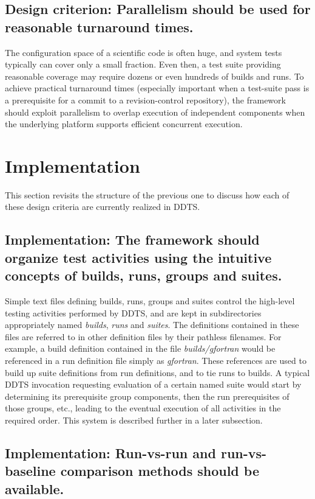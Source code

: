 \documentclass[conference]{IEEEtran}
\begin{document}
\subsection{Design criterion: Parallelism should be used for reasonable turnaround times.}

The configuration space of a scientific code is often huge, and system tests typically can cover only a small fraction. Even then, a test suite providing reasonable coverage may require dozens or even hundreds of builds and runs. To achieve practical turnaround times (especially important when a test-suite pass is a prerequisite for a commit to a revision-control repository), the framework should exploit parallelism to overlap execution of independent components when the underlying platform supports efficient concurrent execution.

\section{Implementation}

This section revisits the structure of the previous one to discuss how each of these design criteria are currently realized in DDTS.

\subsection{Implementation: The framework should organize test activities using the intuitive concepts of builds, runs, groups and suites.}

Simple text files defining builds, runs, groups and suites control the high-level testing activities performed by DDTS, and are kept in subdirectories appropriately named \emph{builds}, \emph{runs} and \emph{suites}. The definitions contained in these files are referred to in other definition files by their pathless filenames. For example, a build definition contained in the file \emph{builds/gfortran} would be referenced in a run definition file simply as \emph{gfortran}. These references are used to build up suite definitions from run definitions, and to tie runs to builds. A typical DDTS invocation requesting evaluation of a certain named suite would start by determining its prerequisite group components, then the run prerequisites of those groups, etc., leading to the eventual execution of all activities in the required order. This system is described further in a later subsection.

\subsection{Implementation: Run-vs-run and run-vs-baseline comparison methods should be available.}
\end{document}
